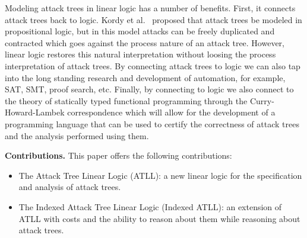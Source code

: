 Modeling attack trees in linear logic has a number of benefits.
First, it connects attack trees back to logic.  Kordy et
al.~\cite{Kordy:2012} proposed that attack trees be modeled in
propositional logic, but in this model attacks can be freely
duplicated and contracted which goes against the process nature of an
attack tree.  However, linear logic restores this natural
interpretation without loosing the process interpretation of attack
trees.  By connecting attack trees to logic we can also tap into the
long standing research and development of automation, for example,
SAT, SMT, proof search, etc.  Finally, by connecting to logic we also
connect to the theory of statically typed functional programming
through the Curry-Howard-Lambek correspondence which will allow for
the development of a programming language that can be used to certify
the correctness of attack trees and the analysis performed using them.

\textbf{Contributions.}  This paper offers the following
contributions:
\begin{itemize}
\item The Attack Tree Linear Logic (ATLL): a new linear logic for the
  specification and analysis of attack trees.
\item The Indexed Attack Tree Linear Logic (Indexed ATLL): an
  extension of ATLL with costs and the ability to reason about them
  while reasoning about attack trees.
\end{itemize}
